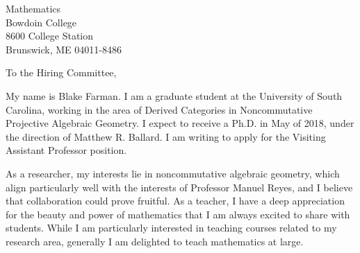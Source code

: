 \documentclass[10pt]{letter}
\date{\today}
\def\position{Visiting Assistant Professor position}
\def\contacts{Manuel Reyes}
\begin{document}
\begin{letter}{
    Mathematics\\
    Bowdoin College\\
    8600 College Station\\
    Brunswick, ME 04011-8486
}
  \opening{To the Hiring Committee,}
  
  My name is Blake Farman.
  I am a graduate student at the University of South Carolina, working in the area of Derived Categories in Noncommutative Projective Algebraic Geometry.
  I expect to receive a Ph.D. in May of 2018, under the direction of Matthew R. Ballard.
  I am writing to apply for the \position.


  As a researcher, my interests lie in noncommutative algebraic geometry, which align particularly well with the interests of Professor \contacts, and I believe that collaboration could prove fruitful. 
  As a teacher, I have a deep appreciation for the beauty and power of mathematics that I am always excited to share with students.
  While I am particularly interested in teaching courses related to my research area, generally I am delighted to teach mathematics at large.


\end{letter}
\end{document}
